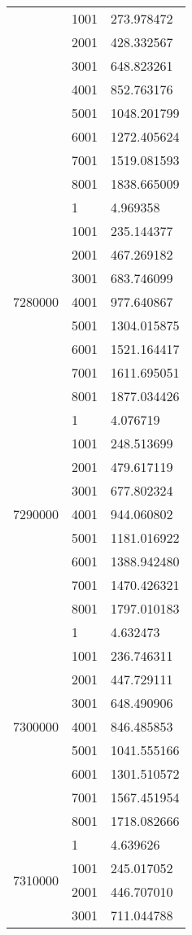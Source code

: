\begin{table}[htb!]
\begin{tabular}{lll}
 & 1001 & 273.978472 \\
 & 2001 & 428.332567 \\
 & 3001 & 648.823261 \\
 & 4001 & 852.763176 \\
 & 5001 & 1048.201799 \\
 & 6001 & 1272.405624 \\
 & 7001 & 1519.081593 \\
 & 8001 & 1838.665009 \\
\multirow[c]{9}{*}{7280000} & 1 & 4.969358 \\
 & 1001 & 235.144377 \\
 & 2001 & 467.269182 \\
 & 3001 & 683.746099 \\
 & 4001 & 977.640867 \\
 & 5001 & 1304.015875 \\
 & 6001 & 1521.164417 \\
 & 7001 & 1611.695051 \\
 & 8001 & 1877.034426 \\
\multirow[c]{9}{*}{7290000} & 1 & 4.076719 \\
 & 1001 & 248.513699 \\
 & 2001 & 479.617119 \\
 & 3001 & 677.802324 \\
 & 4001 & 944.060802 \\
 & 5001 & 1181.016922 \\
 & 6001 & 1388.942480 \\
 & 7001 & 1470.426321 \\
 & 8001 & 1797.010183 \\
\multirow[c]{9}{*}{7300000} & 1 & 4.632473 \\
 & 1001 & 236.746311 \\
 & 2001 & 447.729111 \\
 & 3001 & 648.490906 \\
 & 4001 & 846.485853 \\
 & 5001 & 1041.555166 \\
 & 6001 & 1301.510572 \\
 & 7001 & 1567.451954 \\
 & 8001 & 1718.082666 \\
\multirow[c]{9}{*}{7310000} & 1 & 4.639626 \\
 & 1001 & 245.017052 \\
 & 2001 & 446.707010 \\
 & 3001 & 711.044788 \\

\end{tabular}
\end{table}
